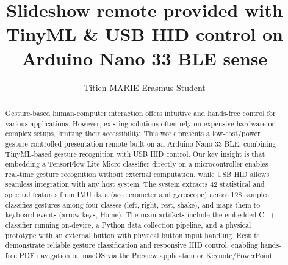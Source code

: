 \documentclass[sigconf,10pt,nonacm]{acmart}
\def\\{}%
\begin{document}
\title{Slideshow remote provided with TinyML \& USB HID control on Arduino Nano 33 BLE sense}

\author{Titien MARIE \\ Erasmus Student}



\renewcommand{\shortauthors}{Titien Marie}


\begin{abstract}
Gesture-based human-computer interaction offers intuitive and hands-free control for various applications. However, existing solutions often rely on expensive hardware or complex setups, limiting their accessibility. This work presents a low-cost/power gesture-controlled presentation remote built on an Arduino Nano 33 BLE, combining TinyML-based gesture recognition with USB HID control.
Our key insight is that embedding a TensorFlow Lite Micro classifier directly on a microcontroller enables real-time gesture recognition without external computation, while USB HID allows seamless integration with any host system. The system extracts 42 statistical and spectral features from IMU data (accelerometer and gyroscope) across 128 samples, classifies gestures among four classes (left, right, rest, shake), and maps them to keyboard events (arrow keys, Home).
The main artifacts include the embedded C++ classifier running on-device, a Python data collection pipeline, and a physical prototype with an external button with physical button input handling. Results demonstrate reliable gesture classification and responsive HID control, enabling hands-free PDF navigation on macOS via the Preview application or Keynote/PowerPoint.
\end{abstract}

\maketitle
%
%
%
\end{document}
